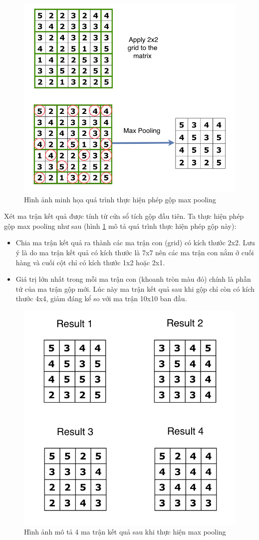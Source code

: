 \begin{figure}[!h]
	\centering
		\includegraphics[width=0.8\columnwidth]{chapter05/figure/max_pooling_example.png}
		\centering
	\caption{Hình ảnh minh họa quá trình thực hiện phép gộp max pooling}
	\label{fig:MaxPoolingExample}
\end{figure}

Xét ma trận kết quả được tính từ cửa sổ tích gộp đầu tiên. Ta thực hiện phép gộp max pooling như sau (hình \ref{fig:MaxPoolingExample} mô tả quá trình thực hiện phép gộp này):
\begin{itemize}
\item Chia ma trận kết quả ra thành các ma trận con (grid) có kích thước 2x2. Lưu ý là do ma trận kết quả có kích thước là 7x7 nên các ma trận con nằm ở cuối hàng và cuối cột chỉ có kích thước 1x2 hoặc 2x1.
\item Giá trị lớn nhất trong mỗi ma trận con (khoanh tròn màu đỏ) chính là phần tử của ma trận gộp mới. Lúc này ma trận kết quả sau khi gộp chỉ còn có kích thước 4x4, giảm đáng kể so với ma trận 10x10 ban đầu.
\end{itemize}

\begin{figure}[!h]
	\centering
		\includegraphics[width=0.6\columnwidth]{chapter05/figure/max_pooling_results.png}
		\centering
	\caption{Hình ảnh mô tả 4 ma trận kết quả sau khi thực hiện max pooling}
	\label{fig:MaxPoolingResults}
\end{figure}

